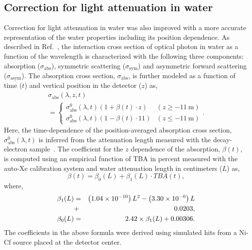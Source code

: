 \documentclass[aps,prd,reprint,superscriptaddress,floatfix,altaffilletter,nofootinbib]{revtex4-2}
\begin{document}
\subsection{Correction for light attenuation in water}
\label{appendix:water_quality}
Correction for light attenuation in water was also improved with a more accurate representation of the water properties including its position dependence. 
As described in Ref.~\cite{Abe:2013gga}, the interaction cross section of optical photon in water as a function of the wavelength is characterized with the following three components: absorption ($\sigma_{\mathrm{abs}}$), symmetric scattering  ($\sigma_{\mathrm{sym}}$) and asymmetric forward scattering  ($\sigma_{\mathrm{asym}}$).
The absorption cross section, $\sigma_{\mathrm{abs}}$, is further modeled as a function of time ($t$) and vertical position in the detector ($z$) as,
\begin{multline}
        \sigma_{\mathrm{abs}}(\lambda, z, t) \\ =
    \begin{cases}
        \sigma_{\mathrm{abs}}^{0}(\lambda, t) (1+\beta (t)\cdot z) & (z \geq \mathrm{-11~m}) \\
        \sigma_{\mathrm{abs}}^{0}(\lambda, t) (1 - \beta (t)\cdot 11) &  (z  \leq \mathrm{-11~m})
    \end{cases}.
\end{multline}
Here, the time-dependence of the position-averaged absorption cross section, $ \sigma_{\mathrm{abs}}^{0}(\lambda, t)$ is inferred from the attenuation length measured with the decay-electron sample~\cite{Abe:2016nxk}. 
The coefficient for the $z$ dependence of the absorption, $\beta(t)$, is computed using an empirical function of TBA in percent measured with the auto-Xe calibration system and water attenuation length in centimeters ($L$) as,
\begin{equation}
    \beta(t) = \beta_{0}(L) + \beta_{1}(L) \cdot TBA(t),
\end{equation}
where,
\begin{eqnarray}
\beta_{1}(L) & = & \left(1.04 \times 10^{-10}\right) L^{2} 
    - \left(3.30 \times 10^{-6}\right) L \notag \\
     & + & 0.0203, \\
\beta_{0}(L) & = & 2.42 \times \beta_{1}(L) + 0.00306.
\end{eqnarray}
The coefficients in the above formula were derived using simulated hits from a Ni-Cf source placed at the detector center.
\end{document}
